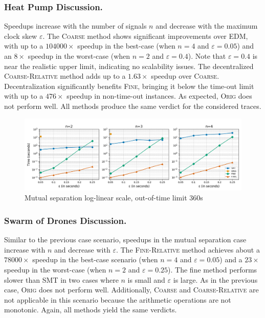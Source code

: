 \subsubsection{Heat Pump Discussion.}
Speedups increase with the number of signals \(n\) and decrease with the maximum clock skew \(\varepsilon\).
The \textsc{Coarse} method shows significant improvements over EDM, with up to a $104000\times$ speedup in the best-case (when \(n=4\) and \(\varepsilon=0.05\)) and an $8\times$ speedup in the worst-case (when \(n=2\) and \(\varepsilon=0.4\)).
Note that \(\varepsilon=0.4\) is near the realistic upper limit, indicating no scalability issues.
The decentralized \textsc{Coarse-Relative} method adds up to a $1.63\times$ speedup over \textsc{Coarse}.
Decentralization significantly benefits \textsc{Fine}, bringing it below the time-out limit with up to a $476\times$ speedup in non-time-out instances.
As expected, \textsc{Orig} does not perform well.
All methods produce the same verdict for the considered traces.

\begin{figure}[htb]
	\begin{center}
		\includegraphics[width=\linewidth]{ms.png}
		\caption{Mutual separation log-linear scale, out-of-time limit 360s}
	\end{center}
\end{figure}

\subsubsection{Swarm of Drones Discussion.}
Similar to the previous case scenario, speedups in the mutual separation case increase with \(n\) and decrease with \(\varepsilon\).
The \textsc{Fine-Relative} method achieves about a $78000\times$ speedup in the best-case scenario (when \(n=4\) and \(\varepsilon=0.05\)) and a $23\times$ speedup in the worst-case (when \(n=2\) and \(\varepsilon=0.25\)).
The fine method performs slower than SMT in two cases where \(n\) is small and \(\varepsilon\) is large.
As in the previous case, \textsc{Orig} does not perform well.
Additionally, \textsc{Coarse} and \textsc{Coarse-Relative} are not applicable in this scenario because the arithmetic operations are not monotonic.
Again, all methods yield the same verdicts.

